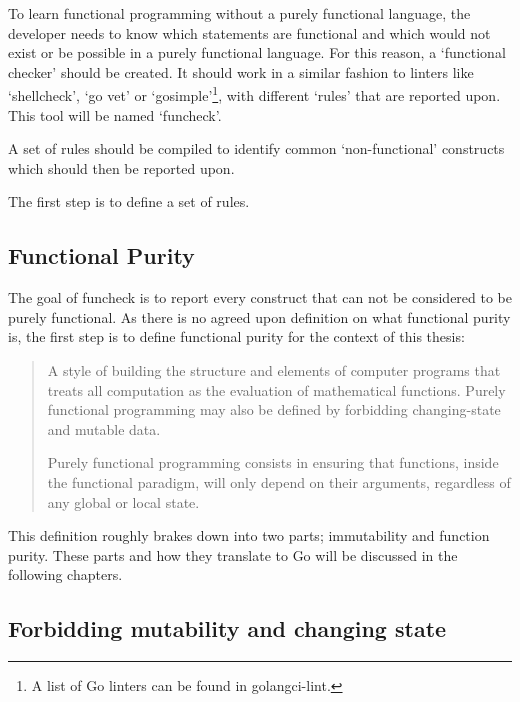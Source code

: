 To learn functional programming without a purely functional language, the
developer needs to know which statements are functional and which
would not exist or be possible in a purely functional language.
For this reason, a `functional checker' should be created. It should work
in a similar fashion to linters like `shellcheck', `go vet' or `gosimple'\footnote{
    A list of Go linters can be found in golangci-lint\autocite{golangci-lint}.
}, with different `rules' that are reported upon. This tool will be named `funcheck'.

A set of rules should be compiled to identify common `non-functional' constructs
which should then be reported upon.

The first step is to define a set of rules.

\subsection{Functional Purity}\label{sec:func-purity}

The goal of funcheck is to report every construct that can not be considered
to be purely functional. As there is no agreed upon definition on what
functional purity is\autocite{functional-controversy}, the first step is to
define functional purity for the context of this thesis:

\begin{quote}
    A style of building the structure and elements of computer programs that
    treats all computation as the evaluation of mathematical functions. Purely
    functional programming may also be defined by forbidding changing-state and
    mutable data.

    Purely functional programming consists in ensuring that functions, inside
    the functional paradigm, will only depend on their arguments, regardless of
    any global or local state.\autocite{functional-purity-wiki}
\end{quote}

This definition roughly brakes down into two parts; immutability and function
purity. These parts and how they translate to Go will be discussed in the
following chapters.

\subsection{Forbidding mutability and changing state}\label{sec:mutability}


